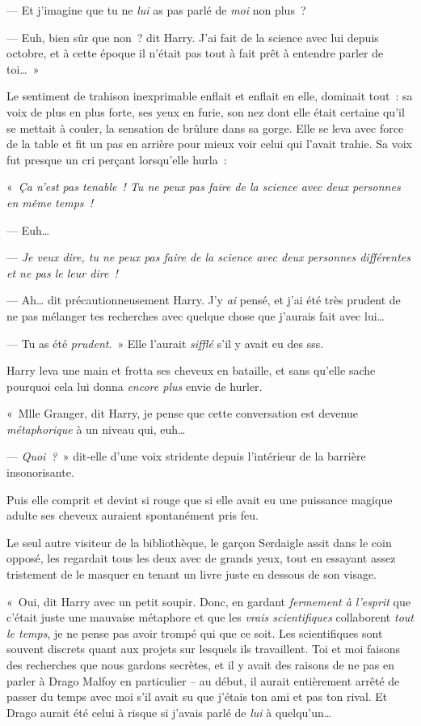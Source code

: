 --- Et j'imagine que tu ne \emph{lui} as pas parlé de \emph{moi} non plus~?

--- Euh, bien sûr que non~? dit Harry. J'ai fait de la science avec lui depuis octobre, et à cette époque il n'était pas tout à fait prêt à entendre parler de toi…~»

Le sentiment de trahison inexprimable enflait et enflait en elle, dominait tout~: sa voix de plus en plus forte, ses yeux en furie, son nez dont elle était certaine qu'il se mettait à couler, la sensation de brûlure dans sa gorge. Elle se leva avec force de la table et fit un pas en arrière pour mieux voir celui qui l'avait trahie. Sa voix fut presque un cri perçant lorsqu'elle hurla~:

«~\emph{Ça n'est pas tenable~! Tu ne peux pas faire de la science avec deux personnes en même temps~!}

--- Euh…

--- \emph{Je veux dire, tu ne peux pas faire de la science avec deux personnes différentes et ne pas le leur dire~!}

--- Ah… dit précautionneusement Harry. J'y \emph{ai} pensé, et j'ai été très prudent de ne pas mélanger tes recherches avec quelque chose que j'aurais fait avec lui…

--- Tu as été \emph{prudent}.~» Elle l'aurait \emph{sifflé} s'il y avait eu des sss.

Harry leva une main et frotta ses cheveux en bataille, et sans qu'elle sache pourquoi cela lui donna \emph{encore plus} envie de hurler.

«~Mlle Granger, dit Harry, je pense que cette conversation est devenue \emph{métaphorique} à un niveau qui, euh…

--- \emph{Quoi~?}~» dit-elle d'une voix stridente depuis l'intérieur de la barrière insonorisante.

Puis elle comprit et devint si rouge que si elle avait eu une puissance magique adulte ses cheveux auraient spontanément pris feu.

Le seul autre visiteur de la bibliothèque, le garçon Serdaigle assit dans le coin opposé, les regardait tous les deux avec de grands yeux, tout en essayant assez tristement de le masquer en tenant un livre juste en dessous de son visage.

«~Oui, dit Harry avec un petit soupir. Donc, en gardant \emph{fermement à l'esprit} que c'était juste une mauvaise métaphore et que les \emph{vrais scientifiques} collaborent \emph{tout le temps}, je ne pense pas avoir trompé qui que ce soit. Les scientifiques sont souvent discrets quant aux projets sur lesquels ils travaillent. Toi et moi faisons des recherches que nous gardons secrètes, et il y avait des raisons de ne pas en parler à Drago Malfoy en particulier -- au début, il aurait entièrement arrêté de passer du temps avec moi s'il avait su que j'étais ton ami et pas ton rival. Et Drago aurait été celui à risque si j'avais parlé de \emph{lui} à quelqu'un…

